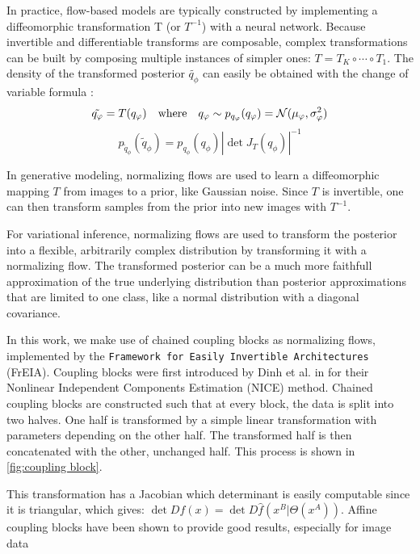 In practice, flow-based models are typically constructed by implementing a diffeomorphic transformation T (or $T^{-1}$) with a neural network.
Because invertible and differentiable transforms are composable, complex transformations can be built by composing multiple instances of simpler ones: $T=T_K \circ \cdots \circ T_1$.
The density of the transformed posterior $\tilde{q_{\phi}}$ can easily be obtained with the change of variable formula \parencite{bogachev2007measure}:
\begin{equation}
    \tilde{q_{\varphi}} = T(q_{\varphi}) \quad \text{where} \quad q_{\varphi} \sim p_{q_{\varphi}}(q_{\varphi}) = \mathcal{N}(\mu_{\varphi}, \sigma^2_{\varphi})
\end{equation}
\begin{equation}
    \label{eq:changeofvariables}
    p_{\tilde{q}_{\phi}}(\tilde{q}_{\phi}) = p_{q_{\phi}}(q_{\phi})|\det J_T(q_{\phi})|^{-1}
\end{equation}

In generative modeling, normalizing flows are used to learn a diffeomorphic mapping $T$ from images to a prior, like Gaussian noise.
Since $T$ is invertible, one can then transform samples from the prior into new images with $T^{-1}$.

For variational inference, normalizing flows are used to transform the posterior into a flexible, arbitrarily complex distribution by transforming it with a normalizing flow.
The transformed posterior can be a much more faithfull approximation of the true underlying distribution than posterior approximations that are limited to one class, like a normal distribution with a diagonal covariance.

\smallskip

In this work, we make use of chained coupling blocks as normalizing flows, implemented by the \textcolor{dg}{\texttt{Framework for Easily Invertible Architectures}} (FrEIA).
Coupling blocks were first introduced by Dinh et al. in \cite{dinh_nice_2015} for their Nonlinear Independent Components Estimation (NICE) method.
Chained coupling blocks are constructed such that at every block, the data is split into two halves.
One half is transformed by a simple linear transformation with parameters depending on the other half.
The transformed half is then concatenated with the other, unchanged half.
This process is shown in \cref{fig:coupling block}.

This transformation has a Jacobian which determinant is easily computable since it is triangular, which gives: $\det Df(x) = \det D\hat{f}(x^B | \Theta (x^A))$.
Affine coupling blocks have been shown to provide good results, especially for image data \citep{dinh_density_2017}

